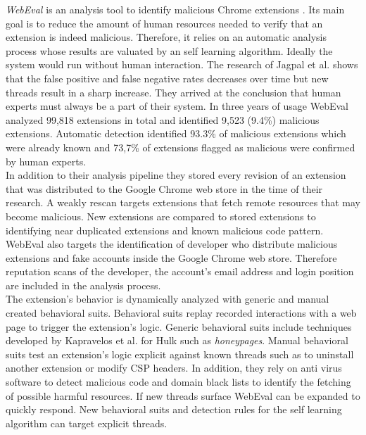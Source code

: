 	\textit{WebEval} is an analysis tool to identify malicious Chrome extensions \cite{190984}. Its main goal is to reduce the amount of human resources needed to verify that an extension is indeed malicious. Therefore, it relies on an automatic analysis process whose results are valuated by an self learning algorithm. Ideally the system would run without human interaction. The research of Jagpal et al. shows that the false positive and false negative rates decreases over time but new threads result in a sharp increase. They arrived at the conclusion that human experts must always be a part of their system. In three years of usage WebEval analyzed 99,818 extensions in total and identified 9,523 (9.4\%) malicious extensions. Automatic detection identified 93.3\% of malicious extensions which were already known and 73,7\% of extensions flagged as malicious were confirmed by human experts. \\
	In addition to their analysis pipeline they stored every revision of an extension that was distributed to the Google Chrome web store in the time of their research. A weakly rescan targets extensions that fetch remote resources that may become malicious. New extensions are compared to stored extensions to identifying near duplicated extensions and known malicious code pattern. WebEval also targets the identification of developer who distribute malicious extensions and fake accounts inside the Google Chrome web store. Therefore reputation scans of the developer, the account's email address and login position are included in the analysis process.  \\
	The extension's behavior is dynamically analyzed with generic and manual created behavioral suits. Behavioral suits replay recorded interactions with a web page to trigger the extension's logic. Generic behavioral suits include techniques developed by Kapravelos	et al. for Hulk \cite{184485} such as \textit{honeypages}. Manual behavioral suits test an extension's logic explicit against known threads such as to uninstall another extension or modify CSP headers. In addition, they rely on anti virus software to detect malicious code and domain black lists to identify the fetching of possible harmful resources. If new threads surface WebEval can be expanded to quickly respond. New behavioral suits and detection rules for the self learning algorithm can target explicit threads. 
	

